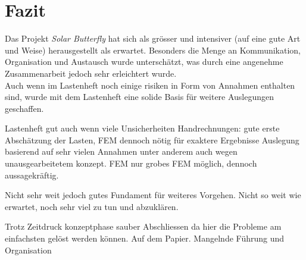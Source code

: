 \section{Fazit}
Das Projekt \emph{Solar Butterfly} hat sich als grösser und intensiver (auf eine gute Art und Weise) herausgestellt als erwartet. Besonders die Menge an Kommunikation, Organisation und Austausch wurde unterschätzt, was durch eine angenehme Zusammenarbeit jedoch sehr erleichtert wurde.\\
Auch wenn im Lastenheft noch einige risiken in Form von Annahmen enthalten sind, wurde mit dem Lastenheft eine solide Basis für weitere Auslegungen geschaffen.


Lastenheft gut auch wenn viele Unsicherheiten
Handrechnungen: gute erste Abschätzung der Lasten, FEM dennoch nötig für exaktere Ergebnisse
Auslegung basierend auf sehr vielen Annahmen unter anderem auch wegen unausgearbeitetem konzept.
FEM nur grobes FEM möglich, dennoch aussagekräftig.


Nicht sehr weit jedoch gutes Fundament für weiteres Vorgehen.
Nicht so weit wie erwartet, noch sehr viel zu tun und abzuklären.

Trotz Zeitdruck konzeptphase sauber Abschliessen da hier die Probleme am einfachsten gelöst werden können. Auf dem Papier.
Mangelnde Führung und Organisation


\newpage

%
